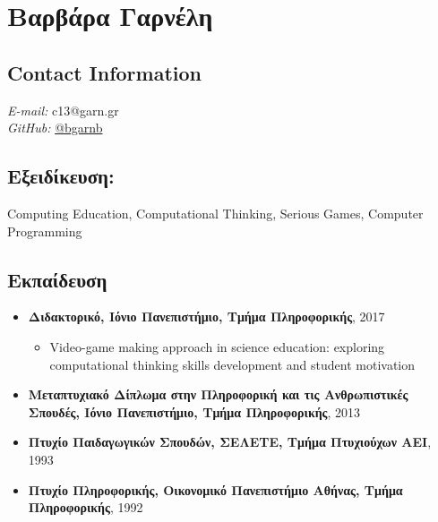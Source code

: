 \documentclass[%
    11pt,
  oneside
  ]{memoir}
\let\oldsection\section
\renewcommand{\section}[1]{%
  \oldsection{#1}
  \leavevmode
  \par
  \vspace{\dimexpr-\baselineskip-\parskip}
}
\begin{document}
      \chapter*{Βαρβάρα Γαρνέλη}
  

  \hypertarget{contact-information}{%
  \section{Contact Information}\label{contact-information}}
    \begin{minipage}[t]{0.3\textwidth}
      
    \end{minipage}
    \begin{minipage}[t]{0.7\textwidth}
                        {\textit{E-mail:}} c13@garn.gr \\
                                        {\textit{GitHub:}} \href{http://github.com/bgarnb}{@bgarnb}
            \end{minipage}
  \hypertarget{ux3b5ux3beux3b5ux3b9ux3b4ux3afux3baux3b5ux3c5ux3c3ux3b7}{%
\section{Εξειδίκευση:}\label{ux3b5ux3beux3b5ux3b9ux3b4ux3afux3baux3b5ux3c5ux3c3ux3b7}}

Computing Education, Computational Thinking, Serious Games, Computer
Programming

\hypertarget{ux3b5ux3baux3c0ux3b1ux3afux3b4ux3b5ux3c5ux3c3ux3b7}{%
\section{Εκπαίδευση}\label{ux3b5ux3baux3c0ux3b1ux3afux3b4ux3b5ux3c5ux3c3ux3b7}}

\begin{itemize}
\tightlist
\item
  \textbf{Διδακτορικό, Ιόνιο Πανεπιστήμιο, Τμήμα Πληροφορικής}, 2017

  \begin{itemize}
  \tightlist
  \item
    Video-game making approach in science education: exploring
    computational thinking skills development and student motivation
  \end{itemize}
\item
  \textbf{Μεταπτυχιακό Δίπλωμα στην Πληροφορική και τις Ανθρωπιστικές
  Σπουδές, Ιόνιο Πανεπιστήμιο, Τμήμα Πληροφορικής}, 2013
\item
  \textbf{Πτυχίο Παιδαγωγικών Σπουδών, ΣΕΛΕΤΕ, Τμήμα Πτυχιούχων ΑΕΙ},
  1993
\item
  \textbf{Πτυχίο Πληροφορικής, Οικονομικό Πανεπιστήμιο Αθήνας, Τμήμα
  Πληροφορικής}, 1992
\end{itemize}
\end{document}
